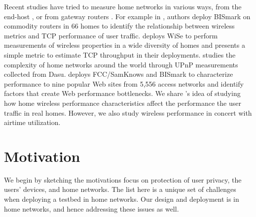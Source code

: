 Recent studies have tried to measure home networks in various ways, from the end-host \cite{chetty2011my}\cite{dicioccio2012probe}\cite{sanchez2013trying}, or from gateway routers \cite{grover2013peeking}\cite{sundaresan2015measuring}\cite{patro2013observing}\cite{sundaresan2013measuring}\cite{pefkianakis2015characterizing}. For example in \cite{sundaresan2015measuring}, authors deploy BISmark on commodity routers in 66 homes to identify the relationship between wireless metrics and TCP performance of user traffic. \cite{patro2013observing} deploys WiSe to perform measurements of wireless properties in a wide diversity of homes and presents a simple metric to estimate TCP throughput in their deployments. \cite{sanchez2013trying} studies the complexity of home networks around the world through UPnP measurements collected from Dasu. \cite{sundaresan2013measuring} deploys FCC/SamKnows and BISmark to characterize performance to nine popular Web sites from 5,556 access networks and identify factors that create Web performance bottlenecks. We share \cite{sundaresan2015measuring}'s idea of studying how home wireless performance characteristics affect the performance the user traffic in real homes. However, we also study wireless performance in concert with airtime utilization.

\section{Motivation}
\label{sec.motivation}
We begin by sketching the motivations focus on protection of user privacy, the users' devices, and home networks. The list here is a unique set of challenges when deploying a testbed in home networks. Our design and deployment is in home networks, and hence addressing these issues as well.

